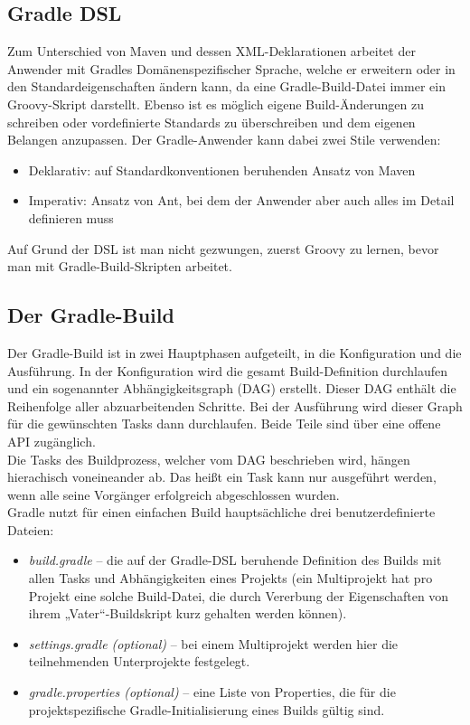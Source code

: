 \subsection{Gradle DSL}
Zum Unterschied von Maven und dessen XML-Deklarationen arbeitet der Anwender mit Gradles Domänenspezifischer Sprache, welche er erweitern oder in den Standardeigenschaften ändern kann, da eine Gradle-Build-Datei immer ein Groovy-Skript darstellt. Ebenso ist es möglich eigene Build-Änderungen zu schreiben oder vordefinierte Standards zu überschreiben und dem eigenen Belangen anzupassen. Der Gradle-Anwender kann dabei zwei Stile verwenden:
\begin{itemize}
	\item Deklarativ: auf Standardkonventionen beruhenden Ansatz von Maven 
	\item Imperativ: Ansatz von Ant, bei dem der Anwender aber auch alles im Detail definieren muss
\end{itemize}

Auf Grund der DSL ist man nicht gezwungen, zuerst Groovy zu lernen, bevor man mit Gradle-Build-Skripten arbeitet.
\subsection{Der Gradle-Build}
Der Gradle-Build ist in zwei Hauptphasen aufgeteilt, in die Konfiguration und die Ausführung. In der Konfiguration wird die gesamt Build-Definition durchlaufen und ein sogenannter Abhängigkeitsgraph (DAG) erstellt. Dieser DAG enthält die Reihenfolge aller abzuarbeitenden Schritte. Bei der Ausführung wird dieser Graph für die gewünschten Tasks dann durchlaufen. Beide Teile sind über eine offene API zugänglich.
\\
Die Tasks des Buildprozess, welcher vom DAG beschrieben wird, hängen hierachisch voneineander ab. Das heißt ein Task kann nur ausgeführt werden, wenn alle seine Vorgänger erfolgreich abgeschlossen wurden.
\\
Gradle nutzt für einen einfachen Build hauptsächliche drei benutzerdefinierte Dateien:
\begin{itemize}
	\item \textit{build.gradle} – die auf der Gradle-DSL beruhende Definition des Builds mit allen Tasks und Abhängigkeiten eines Projekts (ein Multiprojekt hat pro Projekt eine solche Build-Datei, die durch Vererbung der Eigenschaften von ihrem „Vater“-Buildskript kurz gehalten werden können).
    \item \textit{settings.gradle (optional)} – bei einem Multiprojekt werden hier die teilnehmenden Unterprojekte festgelegt.
    \item \textit{gradle.properties (optional)} – eine Liste von Properties, die für die projektspezifische Gradle-Initialisierung eines Builds gültig sind.
\end{itemize}
